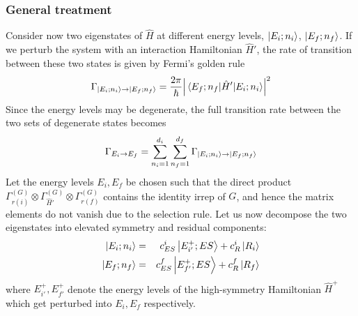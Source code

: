 \documentclass[12pt]{article}
\begin{document}
	\subsubsection{General treatment} \label{sec:fermi}
	
	Consider now two eigenstates of $\hat{H}$ at different energy levels, $\ket{E_i;n_i}$, $\ket{E_f;n_f}$. If we perturb the system with an interaction Hamiltonian $\hat{H}'$, the rate of transition between these two states is given by Fermi's golden rule
	$$\Gamma_{\ket{E_i;n_i}\to \ket{E_f;n_f}}=\frac{2\pi}{\hbar}\abs{\mel{E_f;n_f}{\hat{H}'}{E_i;n_i}}^2$$
	Since the energy levels may be degenerate, the full transition rate between the two sets of degenerate states becomes
	$$\Gamma_{E_i\to E_f}=\sum_{n_i=1}^{d_i}\sum_{n_f=1}^{d_f}\Gamma_{\ket{E_i;n_i}\to \ket{E_f;n_f}}$$
	Let the energy levels $E_i,E_f$ be chosen such that the direct product $\Gamma^{(G)}_{r(i)}\otimes \Gamma^{(G)}_{\hat{H}'}\otimes \Gamma^{(G)}_{r(f)}$ contains the identity irrep of $G$, and hence the matrix elements do not vanish due to the selection rule. Let us now decompose the two eigenstates into elevated symmetry and residual components:
	\begin{eqnarray*}
	\ket{E_i;n_i}&=&c_{ES}^i\ket{E_{i'}^+;ES}+c_R^i\ket{R_i}\\
	\ket{E_f;n_f}&=&c_{ES}^f\ket{E_{f'}^+;ES}+c_R^f\ket{R_f}
	\end{eqnarray*}
	where $E_{i'}^+,E_{f'}^+$ denote the energy levels of the high-symmetry Hamiltonian $\hat{H}^+$ which get perturbed into $E_i,E_f$ respectively.
	
\end{document}
